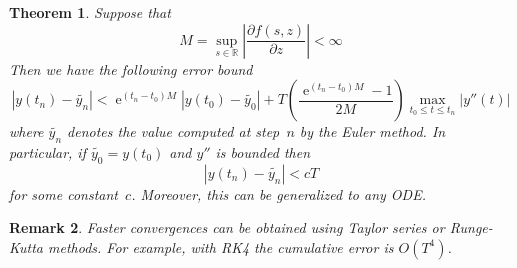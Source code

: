 \documentclass{article}
\newtheorem{theorem}{Theorem}
\newtheorem{remark}[theorem]{Remark}
\newcommand{\ce}{\mathop{\mathrm{e}}}
\newcommand{\R}{\mathbb{R}}
\begin{document}
\begin{theorem}
  Suppose that
  \[
  M=\sup_{s\in\R}\left|\frac{\partial f(s,z)}{\partial z}\right|<\infty
  \]
  Then we have the following error bound
  \[
  |y(t_n)-\tilde{y_n}|<\ce^{(t_n-t_0)M}|y(t_0)-\tilde{y_0}|+T\left(\frac{\ce^{(t_n-t_0)M}-1}{2M}\right)\max_{t_0\leq t\leq t_n}|y''(t)|
  \]
  where $\tilde{y_n}$ denotes the value computed at step~$n$ by the Euler
  method. In particular, if $\tilde{y_0}=y(t_0)$ and $y''$ is bounded then
  \[
  |y(t_n)-\tilde{y_n}|<cT
  \]
  for some constant~$c$. Moreover, this can be generalized to any ODE.
\end{theorem}

\begin{remark}
  Faster convergences can be obtained using Taylor series or Runge-Kutta
  methods. For example, with RK4 the cumulative error is $O(T^4)$.
\end{remark}




\end{document}
